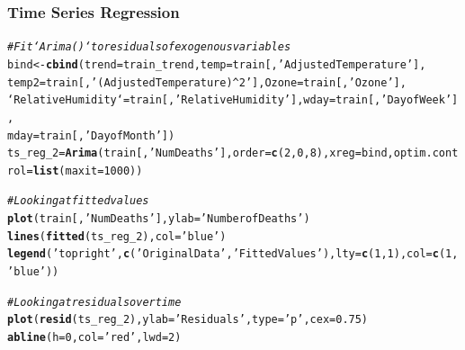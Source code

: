 \documentclass{article}\usepackage[]{graphicx}\usepackage[]{color}
\makeatletter
\newcommand{\hlnum}[1]{\textcolor[rgb]{0.686,0.059,0.569}{#1}}%
\newcommand{\hlstr}[1]{\textcolor[rgb]{0.192,0.494,0.8}{#1}}%
\newcommand{\hlcom}[1]{\textcolor[rgb]{0.678,0.584,0.686}{\textit{#1}}}%
\newcommand{\hlstd}[1]{\textcolor[rgb]{0.345,0.345,0.345}{#1}}%
\newcommand{\hlkwb}[1]{\textcolor[rgb]{0.69,0.353,0.396}{#1}}%
\newcommand{\hlkwc}[1]{\textcolor[rgb]{0.333,0.667,0.333}{#1}}%
\newcommand{\hlkwd}[1]{\textcolor[rgb]{0.737,0.353,0.396}{\textbf{#1}}}%
\newenvironment{kframe}{%
 \def\at@end@of@kframe{}%
 \ifinner\ifhmode%
  \def\at@end@of@kframe{\end{minipage}}%
  \begin{minipage}{\columnwidth}%
 \fi\fi%
 \def\FrameCommand##1{\hskip\@totalleftmargin \hskip-\fboxsep
 \colorbox{shadecolor}{##1}\hskip-\fboxsep
     \hskip-\linewidth \hskip-\@totalleftmargin \hskip\columnwidth}%
 \MakeFramed {\advance\hsize-\width
   \@totalleftmargin\z@ \linewidth\hsize
   \@setminipage}}%
 {\par\unskip\endMakeFramed%
 \at@end@of@kframe}
\newenvironment{knitrout}{}{} %
\makeatother
\begin{document}
\subsubsection*{Time Series Regression}
\begin{knitrout}
\color{fgcolor}\begin{kframe}
\begin{alltt}
\hlcom{# Fit `Arima()` to residuals of exogenous variables}
\hlstd{bind} \hlkwb{<-} \hlkwd{cbind}\hlstd{(}\hlkwc{trend}\hlstd{=train_trend,} \hlkwc{temp}\hlstd{=train[,}\hlstr{'Adjusted Temperature'}\hlstd{],}
  \hlkwc{temp2}\hlstd{=train[,}\hlstr{'(Adjusted Temperature)^2'}\hlstd{],} \hlkwc{Ozone}\hlstd{=train[,}\hlstr{'Ozone'}\hlstd{],}
  \hlkwc{`Relative Humidity`}\hlstd{=train[,}\hlstr{'Relative Humidity'}\hlstd{],} \hlkwc{wday}\hlstd{=train[,}\hlstr{'Day of Week'}\hlstd{],}
  \hlkwc{mday}\hlstd{=train[,}\hlstr{'Day of Month'}\hlstd{])}
\hlstd{ts_reg_2} \hlkwb{=} \hlkwd{Arima}\hlstd{(train[,}\hlstr{'Num Deaths'}\hlstd{],} \hlkwc{order}\hlstd{=}\hlkwd{c}\hlstd{(}\hlnum{2}\hlstd{,} \hlnum{0}\hlstd{,} \hlnum{8}\hlstd{),} \hlkwc{xreg}\hlstd{=bind,} \hlkwc{optim.control}\hlstd{=}\hlkwd{list}\hlstd{(}\hlkwc{maxit}\hlstd{=}\hlnum{1000}\hlstd{))}

\hlcom{# Looking at fitted values}
\hlkwd{plot}\hlstd{(train[,}\hlstr{'Num Deaths'}\hlstd{],} \hlkwc{ylab}\hlstd{=}\hlstr{'Number of Deaths'}\hlstd{)}
\hlkwd{lines}\hlstd{(}\hlkwd{fitted}\hlstd{(ts_reg_2),} \hlkwc{col}\hlstd{=}\hlstr{'blue'}\hlstd{)}
\hlkwd{legend}\hlstd{(}\hlstr{'topright'}\hlstd{,} \hlkwd{c}\hlstd{(}\hlstr{'Original Data'}\hlstd{,} \hlstr{'Fitted Values'}\hlstd{),} \hlkwc{lty}\hlstd{=}\hlkwd{c}\hlstd{(}\hlnum{1}\hlstd{,}\hlnum{1}\hlstd{),} \hlkwc{col}\hlstd{=}\hlkwd{c}\hlstd{(}\hlnum{1}\hlstd{,}\hlstr{'blue'}\hlstd{))}

\hlcom{# Looking at residuals over time}
\hlkwd{plot}\hlstd{(}\hlkwd{resid}\hlstd{(ts_reg_2),} \hlkwc{ylab}\hlstd{=}\hlstr{'Residuals'}\hlstd{,} \hlkwc{type}\hlstd{=}\hlstr{'p'}\hlstd{,} \hlkwc{cex}\hlstd{=}\hlnum{0.75}\hlstd{)}
\hlkwd{abline}\hlstd{(}\hlkwc{h}\hlstd{=}\hlnum{0}\hlstd{,} \hlkwc{col}\hlstd{=}\hlstr{'red'}\hlstd{,} \hlkwc{lwd}\hlstd{=}\hlnum{2}\hlstd{)}
\end{alltt}
\end{kframe}
\end{knitrout}
\end{document}
